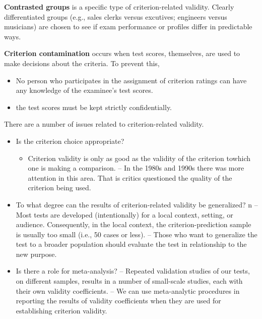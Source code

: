 \documentclass[
  english,
]{book}
\providecommand{\tightlist}{%
  \setlength{\itemsep}{0pt}\setlength{\parskip}{0pt}}
\begin{document}
\textbf{Contrasted groups} is a specific type of criterion-related validity. Clearly differentiated groups (e.g., sales clerks versus excutives; engineers versus musicians) are chosen to see if exam performance or profiles differ in predictable ways.

\textbf{Criterion contamination} occurs when test scores, themselves, are used to make decisions about the criteria. To prevent this,

\begin{itemize}
\tightlist
\item
  No person who participates in the assignment of criterion ratings can have any knowledge of the examinee's test scores.\\
\item
  the test scores must be kept strictly confidentially.
\end{itemize}

There are a number of issues related to criterion-related validity.

\begin{itemize}
\tightlist
\item
  Is the criterion choice appropriate?

  \begin{itemize}
  \tightlist
  \item
    Criterion validity is only as good as the validity of the criterion towhich one is making a comparison.
    -- In the 1980s and 1990s there was more attention in this area. That is critics questioned the quality of the criterion being used.
  \end{itemize}
\item
  To what degree can the results of criterion-related validity be generalized? n
  -- Most tests are developed (intentionally) for a local context, setting, or audience. Consequently, in the local context, the criterion-prediction sample is usually too small (i.e., 50 cases or less).
  -- Those who want to generalize the test to a broader population should evaluate the test in relationship to the new purpose.
\item
  Is there a role for meta-analysis?
  -- Repeated validation studies of our tests, on different samples, results in a number of small-scale studies, each with their own validity coefficients.
  -- We can use meta-analytic procedures in reporting the results of validity coefficients when they are used for establishing criterion validity.
\end{itemize}
\end{document}
